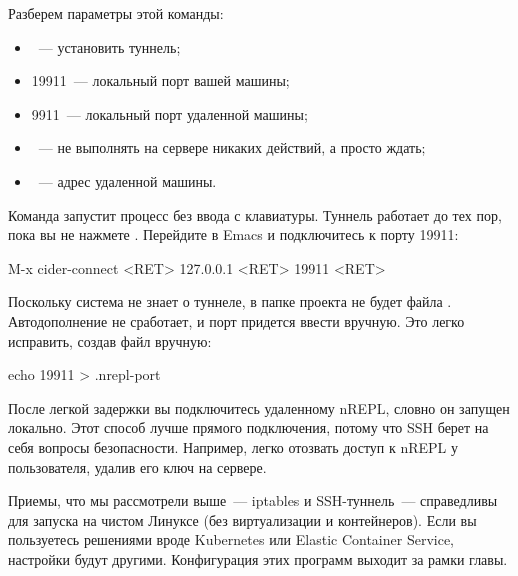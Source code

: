 Разберем параметры этой команды:

\begin{itemize}

\item
  ~--- установить туннель;

\item
  19911~--- локальный порт вашей машины;

\item
  9911~--- локальный порт удаленной машины;

\item
  ~--- не выполнять на сервере никаких действий, а просто ждать;

\item
  ~--- адрес удаленной машины.

\end{itemize}

Команда запустит процесс  без ввода с клавиатуры. Туннель работает до тех пор, пока вы не нажмете . Перейдите в Emacs и подключитесь к порту 19911:

\begin{english}
  \begin{clojure}
M-x cider-connect <RET> 127.0.0.1 <RET> 19911 <RET>
  \end{clojure}
\end{english}

Поскольку система не знает о туннеле, в папке проекта не будет файла . Автодополнение не сработает, и порт придется ввести вручную. Это легко исправить, создав файл вручную:

\begin{english}
  \begin{bash}
echo 19911 > .nrepl-port
  \end{bash}
\end{english}

После легкой задержки вы подключитесь удаленному nREPL, словно он запущен локально. Этот способ лучше прямого подключения, потому что SSH берет на себя вопросы безопасности. Например, легко отозвать доступ к nREPL у пользователя, удалив его ключ на сервере.

Приемы, что мы рассмотрели выше~--- iptables и SSH-туннель~--- справедливы для запуска на чистом Линуксе (без виртуализации и контейнеров). Если вы пользуетесь решениями вроде Kubernetes или Elastic Container Service, настройки будут другими. Конфигурация этих программ выходит за рамки главы.

